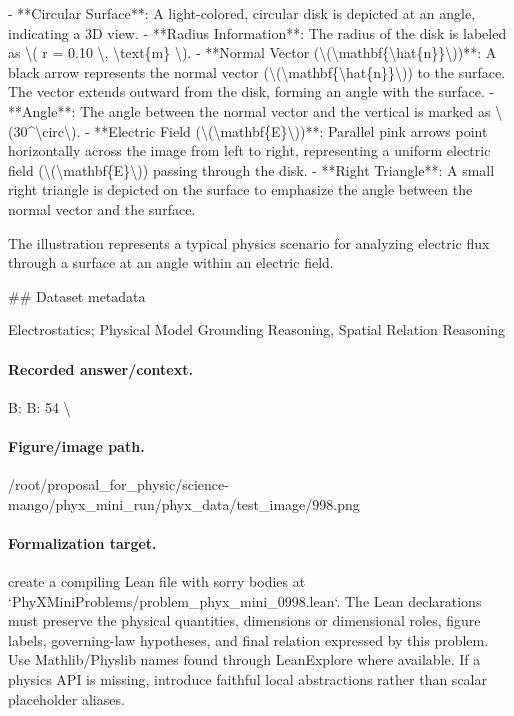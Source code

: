 - **Circular Surface**: A light-colored, circular disk is depicted at an angle, indicating a 3D view.
- **Radius Information**: The radius of the disk is labeled as \textbackslash{}( r = 0.10 \textbackslash{}, \textbackslash{}text\{m\} \textbackslash{}).
- **Normal Vector (\textbackslash{}(\textbackslash{}mathbf\{\textbackslash{}hat\{n\}\}\textbackslash{}))**: A black arrow represents the normal vector (\textbackslash{}(\textbackslash{}mathbf\{\textbackslash{}hat\{n\}\}\textbackslash{})) to the surface. The vector extends outward from the disk, forming an angle with the surface.
- **Angle**: The angle between the normal vector and the vertical is marked as \textbackslash{}(30\textasciicircum{}\textbackslash{}circ\textbackslash{}).
- **Electric Field (\textbackslash{}(\textbackslash{}mathbf\{E\}\textbackslash{}))**: Parallel pink arrows point horizontally across the image from left to right, representing a uniform electric field (\textbackslash{}(\textbackslash{}mathbf\{E\}\textbackslash{})) passing through the disk.
- **Right Triangle**: A small right triangle is depicted on the surface to emphasize the angle between the normal vector and the surface.

The illustration represents a typical physics scenario for analyzing electric flux through a surface at an angle within an electric field.

\#\# Dataset metadata

Electrostatics; Physical Model Grounding Reasoning, Spatial Relation Reasoning

\paragraph{Recorded answer/context.}
B: B: 54 \textbackslash{}

\paragraph{Figure/image path.}
/root/proposal\_for\_physic/science-mango/phyx\_mini\_run/phyx\_data/test\_image/998.png

\paragraph{Formalization target.}
create a compiling Lean file with sorry bodies at `PhyXMiniProblems/problem\_phyx\_mini\_0998.lean`. The Lean declarations must preserve the physical quantities, dimensions or dimensional roles, figure labels, governing-law hypotheses, and final relation expressed by this problem.
Use Mathlib/Physlib names found through LeanExplore where available. If a physics API is missing, introduce faithful local abstractions rather than scalar placeholder aliases.

